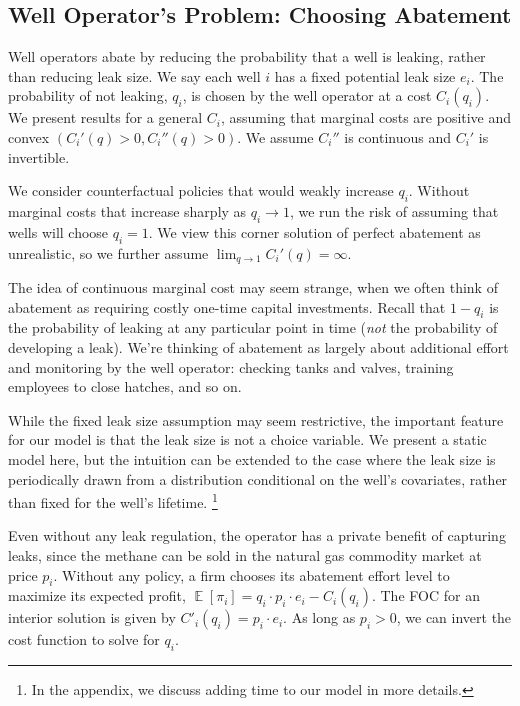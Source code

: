 \documentclass[12pt,oneside,letterpaper]{article}
\theoremstyle{definition}
\DeclareMathOperator{\blackboardE}{\mathbb{E}}
\newcommand{\expected}[1]{\blackboardE\left[#1\right]}
\begin{document}
\begin{refsection}
\subsection{Well Operator's Problem: Choosing Abatement}
\label{sec:well-operator-problem-choosing-abatement}

\noindent
Well operators abate by reducing the probability that a well is leaking, rather than reducing leak size.
We say each well \(i\) has a fixed potential leak size \(e_i\).
The probability of not leaking, \(q_i\), is chosen by the well operator at a cost \(C_i(q_i)\).
We present results for a general \(C_i\), assuming that marginal costs are positive and convex \((C_i'(q) > 0, C_i''(q) > 0)\).
We assume \(C_i''\) is continuous and \(C_i'\) is invertible.

We consider counterfactual policies that would weakly increase \(q_i\).
Without marginal costs that increase sharply as \(q_i \to \text{1}\), we run the risk of assuming that wells will choose \(q_i = \text{1}\).
We view this corner solution of perfect abatement as unrealistic, so we
further assume
\(\lim_{q \to 1} C_i'(q) = \infty\).

The idea of continuous marginal cost may seem strange, when we often think of abatement as requiring costly one-time capital investments.
Recall that \(1 - q_i\) is the probability of leaking at any particular point in time (\emph{not} the probability of developing a leak).
We're thinking of abatement as largely about additional effort and monitoring by the well operator: checking tanks and valves, training employees to close hatches, and so on.

While the fixed leak size assumption may seem restrictive, the important feature for our model is that the leak size is not a choice variable.
We present a static model here, but the intuition can be extended to the case where the leak size is periodically drawn from a distribution conditional on the well's covariates, rather than fixed for the well's lifetime. \footnote{In the appendix, we discuss adding time to our model in more details.}

Even without any leak regulation, the operator has a private benefit of capturing leaks, since the methane can be sold in the natural gas commodity market at price \(p_i\).
Without any policy, a firm chooses its abatement effort level to maximize its expected profit, $\expected{\pi_i} = q_i \cdot p_i \cdot e_i - C_i(q_i)$.
The \gls{FOC} for an interior solution is given by $C'_i(q_i) = p_i \cdot e_i$.
As long as \(p_i > 0\), we can invert the cost function to solve for \(q_i\).


\end{refsection}
\end{document}
